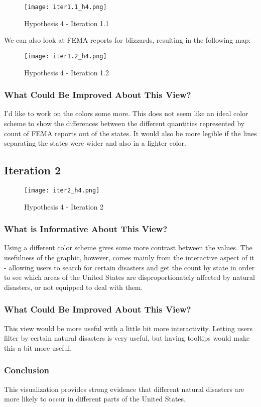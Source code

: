 \documentclass[11pt, letter]{article}
\begin{document}
 \begin{figure}[h]
    \centering
    \texttt{[image: iter1.1\_h4.png]}
    \caption{Hypothesis 4 - Iteration 1.1}
    \label{fig:my_label}
\end{figure}

We can also look at FEMA reports for blizzards, resulting in the following map:

 \begin{figure}[h]
    \centering
    \texttt{[image: iter1.2\_h4.png]}
    \caption{Hypothesis 4 - Iteration 1.2}
    \label{fig:my_label}
\end{figure}

\subsubsection*{What Could Be Improved About This View?}
 I’d like to work on the colors some more. This does not seem like an ideal color scheme to show the differences between the different quantities represented by count of FEMA reports out of the states. It would also be more legible if the lines separating the states were wider and also in a lighter color.
 
\subsection*{Iteration 2}
 
 \begin{figure}[h]
    \centering
    \texttt{[image: iter2\_h4.png]}
    \caption{Hypothesis 4 - Iteration 2}
    \label{fig:my_label}
\end{figure}

\subsubsection*{What is Informative About This View?}
Using a different color scheme gives some more contrast between the values. The usefulness of the graphic, however, comes mainly from the interactive aspect of it - allowing users to search for certain disasters and get the count by state in order to see which areas of the United States are disproportionately affected by natural disasters, or not equipped to deal with them.

\subsubsection*{What Could Be Improved About This View?}
 This view would be more useful with a little bit more interactivity. Letting users filter by certain natural disasters is very useful, but having tooltips would make this a bit more useful.

\subsubsection*{Conclusion}
This visualization provides strong evidence that different natural disasters are more likely to occur in different parts of the United States.
\end{document}
